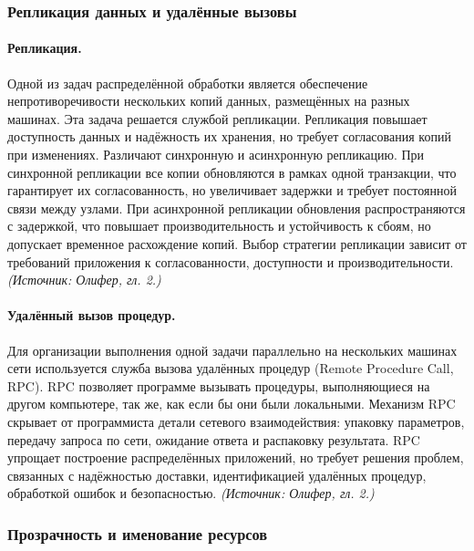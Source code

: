 \documentclass[a4paper,12pt]{article}
\begin{document}
\subsubsection{Репликация данных и удалённые вызовы}

\paragraph{Репликация.}
Одной из задач распределённой обработки является обеспечение непротиворечивости нескольких копий данных, размещённых на разных машинах. Эта задача решается службой репликации. Репликация повышает доступность данных и надёжность их хранения, но требует согласования копий при изменениях. Различают синхронную и асинхронную репликацию. При синхронной репликации все копии обновляются в рамках одной транзакции, что гарантирует их согласованность, но увеличивает задержки и требует постоянной связи между узлами. При асинхронной репликации обновления распространяются с задержкой, что повышает производительность и устойчивость к сбоям, но допускает временное расхождение копий. Выбор стратегии репликации зависит от требований приложения к согласованности, доступности и производительности.
\textit{(Источник: Олифер, гл. 2.)}

\paragraph{Удалённый вызов процедур.}
Для организации выполнения одной задачи параллельно на нескольких машинах сети используется служба вызова удалённых процедур (Remote Procedure Call, RPC). RPC позволяет программе вызывать процедуры, выполняющиеся на другом компьютере, так же, как если бы они были локальными. Механизм RPC скрывает от программиста детали сетевого взаимодействия: упаковку параметров, передачу запроса по сети, ожидание ответа и распаковку результата. RPC упрощает построение распределённых приложений, но требует решения проблем, связанных с надёжностью доставки, идентификацией удалённых процедур, обработкой ошибок и безопасностью.
\textit{(Источник: Олифер, гл. 2.)}

\subsubsection{Прозрачность и именование ресурсов}
\end{document}

